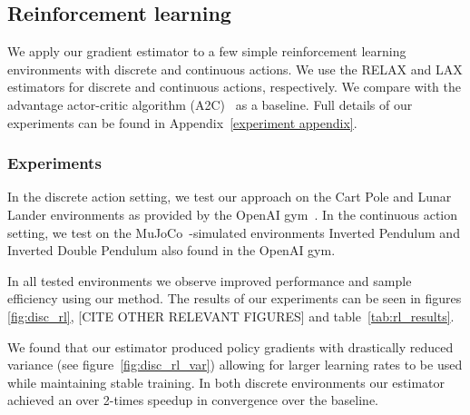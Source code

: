 \documentclass{article}
\newcommand{\LAX}{{\textnormal{LAX}}}
\newcommand{\RELAX}{{\textnormal{RELAX}}}
\begin{document}
\subsection{Reinforcement learning}
We apply our gradient estimator to a few simple reinforcement learning environments with discrete and continuous actions.
We use the \RELAX{} and \LAX{} estimators for discrete and continuous actions, respectively.
We compare with the advantage actor-critic algorithm (A2C)~\cite{sutton2000policy} as a baseline. Full details of our experiments can be found in Appendix~\ref{experiment appendix}.



\subsubsection{Experiments}

In the discrete action setting, we test our approach on the Cart Pole and Lunar Lander environments as provided by the OpenAI gym~\cite{1606.01540}. In the continuous action setting, we test on the MuJoCo~\cite{todorov2012mujoco}-simulated environments Inverted Pendulum and Inverted Double Pendulum also found in the OpenAI gym.

In all tested environments we observe improved performance and sample efficiency using our method. The results of our experiments can be seen in figures \ref{fig:disc_rl}, [CITE OTHER RELEVANT FIGURES] and table~\ref{tab:rl_results}.

We found that our estimator produced policy gradients with drastically reduced variance (see figure~\ref{fig:disc_rl_var}) allowing for larger learning rates to be used while maintaining stable training. In both discrete environments our estimator achieved an over 2-times speedup in convergence over the baseline.
\end{document}
